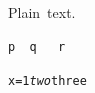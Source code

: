 \documentclass{article}
\begin{document}
Plain~text.

\begin{verbatim}
p  q   r
\end{verbatim}

\begin{alltt}
x  =  1   \emph{two}  three
\end{alltt}


\end{document}

